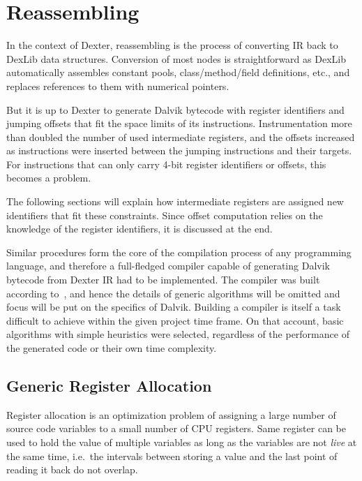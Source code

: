 \documentclass[12pt,twoside,notitlepage]{report}
\begin{document}
\section{Reassembling}

In the context of Dexter, reassembling is the process of converting IR back to DexLib data structures. Conversion of most nodes is straightforward as DexLib automatically assembles constant pools, class/method/field definitions, etc., and replaces references to them with numerical pointers. 

But it is up to Dexter to generate Dalvik bytecode with register identifiers and jumping offsets that fit the space limits of its instructions. Instrumentation more than doubled the number of used intermediate registers, and the offsets increased as instructions were inserted between the jumping instructions and their targets. For instructions that can only carry 4-bit register identifiers or offsets, this becomes a problem.

The following sections will explain how intermediate registers are assigned new identifiers that fit these constraints. Since offset computation relies on the knowledge of the register identifiers, it is discussed at the end.

Similar procedures form the core of the compilation process of any programming language, and therefore a full-fledged compiler capable of generating Dalvik bytecode from Dexter IR had to be implemented. The compiler was built according to~\cite{Appel:2003:MCI:599718}, and hence the details of generic algorithms will be omitted and focus will be put on the specifics of Dalvik. Building a compiler is itself a task difficult to achieve within the given project time frame. On that account, basic algorithms with simple heuristics were selected, regardless of the performance of the generated code or their own time complexity.

\subsection{Generic Register Allocation}

Register allocation is an optimization problem of assigning a large number of source code variables to a small number of CPU registers. Same register can be used to hold the value of multiple variables as long as the variables are not \emph{live} at the same time, i.e.\ the intervals between storing a value and the last point of reading it back do not overlap. 
\end{document}
